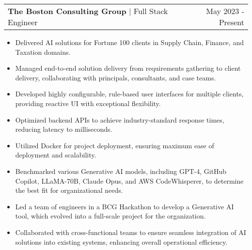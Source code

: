 \documentclass[a4paper,12pt]{article}
\makeatletter
\newenvironment{jobshort}[2]
    {
    \begin{tabularx}{\linewidth}{@{}l X r@{}}
    \textbf{#1} & \hfill &  #2 \\[3.75pt]
    \end{tabularx}
    }
    {
    }
\newenvironment{joblong}[3]
    {
    \begin{tabularx}{\linewidth}{@{}l X r@{}}
    \textbf{#1} | #2 & \hfill &  #3 \\[3.75pt]
    \end{tabularx}
    \begin{minipage}[t]{\linewidth}
    \begin{itemize}[nosep,after=\strut, leftmargin=1em, itemsep=3pt,label=-]
    }
    {
    \end{itemize}
    \end{minipage}    
    }
\makeatother
\begin{document}


\begin{joblong}{The Boston Consulting Group}{Full Stack Engineer}{May 2023 - Present}
    
\item Delivered AI solutions for Fortune 100 clients in Supply Chain, Finance, and Taxation domains.
\item Managed end-to-end solution delivery from requirements gathering to client delivery, collaborating with principals, consultants, and case teams.
\item Developed highly configurable, rule-based user interfaces for multiple clients, providing reactive UI with exceptional flexibility.
\item Optimized backend APIs to achieve industry-standard response times, reducing latency to milliseconds.
\item Utilized Docker for project deployment, ensuring maximum ease of deployment and scalability.
\item Benchmarked various Generative AI models, including GPT-4, GitHub Copilot, LLaMA-70B, Claude Opus, and AWS CodeWhisperer, to determine the best fit for organizational needs.
\item Led a team of engineers in a BCG Hackathon to develop a Generative AI tool, which evolved into a full-scale project for the organization.
\item Collaborated with cross-functional teams to ensure seamless integration of AI solutions into existing systems, enhancing overall operational efficiency.

\end{joblong}
\end{document}
